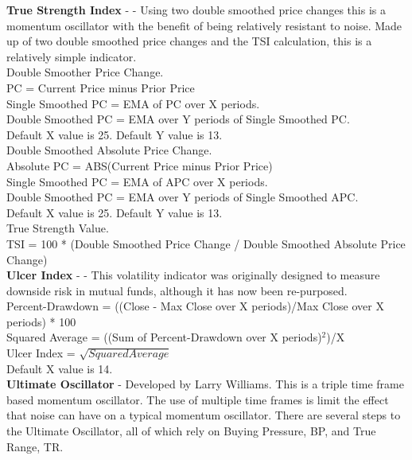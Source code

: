 \documentclass[conference]{IEEEtran}
\begin{document}

\noindent
\textbf{True Strength Index} - \cite{Blau1995} - Using two double smoothed price changes this is a momentum oscillator with the benefit of being relatively resistant to noise. Made up of two double smoothed price changes and the TSI calculation, this is a relatively simple indicator.\\

\noindent
Double Smoother Price Change.\\
PC = Current Price minus Prior Price\\
Single Smoothed PC = EMA of PC over X periods.\\
Double Smoothed PC = EMA over Y periods of Single Smoothed PC.\\
Default X value is 25. Default Y value is 13.\\

\noindent
Double Smoothed Absolute Price Change. \\
Absolute PC = ABS(Current Price minus Prior Price)\\
Single Smoothed PC = EMA of APC over X periods.\\
Double Smoothed PC = EMA over Y periods of Single Smoothed APC.\\
Default X value is 25. Default Y value is 13.\\

\noindent
True Strength Value.\\
TSI = 100 * (Double Smoothed Price Change / Double Smoothed Absolute Price Change)\\

\noindent
\textbf{Ulcer Index} - \cite{Martin1992} - This volatility indicator was originally designed to measure downside risk in mutual funds, although it has now been re-purposed.  \\

\noindent
Percent-Drawdown = ((Close - Max Close over X periods)/Max Close over X periods) * 100\\
Squared Average = ((Sum of Percent-Drawdown over X periods)$^2$)/X\\
Ulcer Index = $\sqrt{Squared Average}$\\
Default X value is 14.\\

\noindent
\textbf{Ultimate Oscillator} - Developed by Larry Williams. This is a triple time frame based momentum oscillator. The use of multiple time frames is limit the effect that noise can have on a typical momentum oscillator. There are several steps to the Ultimate Oscillator, all of which rely on Buying Pressure, BP, and True Range, TR.\\
\end{document}
